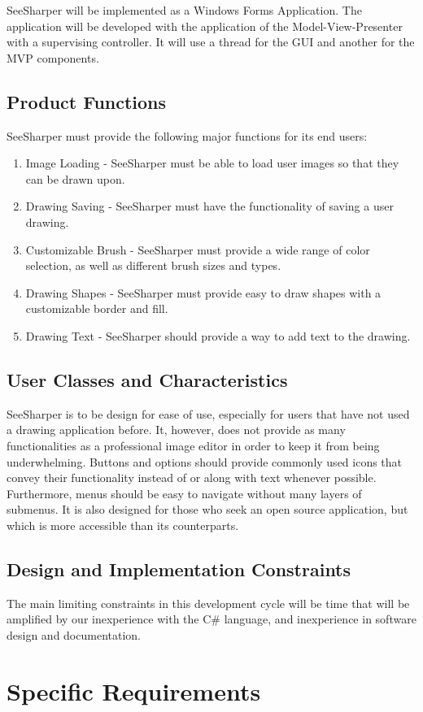 \documentclass{article}
\begin{document}
SeeSharper will be implemented as a Windows Forms Application. The application will be developed with the application of the Model-View-Presenter with a supervising controller. It will use a thread for the GUI and another for the MVP components.
\subsection{Product Functions}
SeeSharper must provide the following major functions for its end users:
\begin{enumerate}
\item Image Loading - SeeSharper must be able to load user images so that they can be drawn upon.
\item Drawing Saving - SeeSharper must have the functionality of saving a user drawing.
\item Customizable Brush - SeeSharper must provide a wide range of color selection, as well as different brush sizes and types.
\item Drawing Shapes - SeeSharper must provide easy to draw shapes with a customizable border and fill. 
\item Drawing Text - SeeSharper should provide a way to add text to the drawing.
\end{enumerate}
\subsection{User Classes and Characteristics}
SeeSharper is to be design for ease of use, especially for users that have not used a drawing application before. It, however, does not provide as many functionalities as a professional image editor in order to keep it from being underwhelming. Buttons and options should provide commonly used icons that convey their functionality instead of or along with text whenever possible. Furthermore, menus should be easy to navigate without many layers of submenus. It is also designed for those who seek an open source application, but which is more accessible than its counterparts.
\subsection{Design and Implementation Constraints}
The main limiting constraints in this development cycle will be time that will be amplified by our inexperience with the C\# language, and inexperience in software design and documentation.

\section{Specific Requirements}
\end{document}
